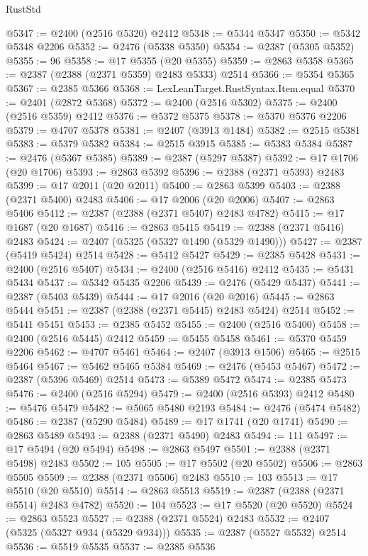 \begin{lexlean}{RustStd}
\begin{coremodule}
{\begin{coremodule}
{{{{{{{{{{{{{{{{{{{{{{{{{{{{{{{{{{{{{{{{{{{{{{{{{{@5347 := @2400 (@2516 @5320) @2412
@5348 := @5344 @5347
@5350 := @5342 @5348 @2206
@5352 := @2476 (@5338 @5350)
@5354 := @2387 (@5305 @5352)
@5355 := 96
@5358 := @17 @5355 (@20 @5355)
@5359 := @2863 @5358
@5365 := @2387 (@2388 (@2371 @5359) @2483 @5333) @2514
@5366 := @5354 @5365
@5367 := @2385 @5366
@5368 := LexLeanTarget.RustSyntax.Item.equal
@5370 := @2401 (@2872 @5368)
@5372 := @2400 (@2516 @5302)
@5375 := @2400 (@2516 @5359) @2412
@5376 := @5372 @5375
@5378 := @5370 @5376 @2206
@5379 := @4707 @5378
@5381 := @2407 (@3913 @1484)
@5382 := @2515 @5381
@5383 := @5379 @5382
@5384 := @2515 @3915
@5385 := @5383 @5384
@5387 := @2476 (@5367 @5385)
@5389 := @2387 (@5297 @5387)
@5392 := @17 @1706 (@20 @1706)
@5393 := @2863 @5392
@5396 := @2388 (@2371 @5393) @2483
@5399 := @17 @2011 (@20 @2011)
@5400 := @2863 @5399
@5403 := @2388 (@2371 @5400) @2483
@5406 := @17 @2006 (@20 @2006)
@5407 := @2863 @5406
@5412 := @2387 (@2388 (@2371 @5407) @2483 @4782)
@5415 := @17 @1687 (@20 @1687)
@5416 := @2863 @5415
@5419 := @2388 (@2371 @5416) @2483
@5424 := @2407 (@5325 (@5327 @1490 (@5329 @1490)))
@5427 := @2387 (@5419 @5424) @2514
@5428 := @5412 @5427
@5429 := @2385 @5428
@5431 := @2400 (@2516 @5407)
@5434 := @2400 (@2516 @5416) @2412
@5435 := @5431 @5434
@5437 := @5342 @5435 @2206
@5439 := @2476 (@5429 @5437)
@5441 := @2387 (@5403 @5439)
@5444 := @17 @2016 (@20 @2016)
@5445 := @2863 @5444
@5451 := @2387 (@2388 (@2371 @5445) @2483 @5424) @2514
@5452 := @5441 @5451
@5453 := @2385 @5452
@5455 := @2400 (@2516 @5400)
@5458 := @2400 (@2516 @5445) @2412
@5459 := @5455 @5458
@5461 := @5370 @5459 @2206
@5462 := @4707 @5461
@5464 := @2407 (@3913 @1506)
@5465 := @2515 @5464
@5467 := @5462 @5465 @5384
@5469 := @2476 (@5453 @5467)
@5472 := @2387 (@5396 @5469) @2514
@5473 := @5389 @5472
@5474 := @2385 @5473
@5476 := @2400 (@2516 @5294)
@5479 := @2400 (@2516 @5393) @2412
@5480 := @5476 @5479
@5482 := @5065 @5480 @2193
@5484 := @2476 (@5474 @5482)
@5486 := @2387 (@5290 @5484)
@5489 := @17 @1741 (@20 @1741)
@5490 := @2863 @5489
@5493 := @2388 (@2371 @5490) @2483
@5494 := 111
@5497 := @17 @5494 (@20 @5494)
@5498 := @2863 @5497
@5501 := @2388 (@2371 @5498) @2483
@5502 := 105
@5505 := @17 @5502 (@20 @5502)
@5506 := @2863 @5505
@5509 := @2388 (@2371 @5506) @2483
@5510 := 103
@5513 := @17 @5510 (@20 @5510)
@5514 := @2863 @5513
@5519 := @2387 (@2388 (@2371 @5514) @2483 @4782)
@5520 := 104
@5523 := @17 @5520 (@20 @5520)
@5524 := @2863 @5523
@5527 := @2388 (@2371 @5524) @2483
@5532 := @2407 (@5325 (@5327 @934 (@5329 @934)))
@5535 := @2387 (@5527 @5532) @2514
@5536 := @5519 @5535
@5537 := @2385 @5536
}}}}}}}}}}}}}}}}}}}}}}}}}}}}}}}}}}}}}}}}}}}}}}}}}}
\end{coremodule}}
\end{coremodule}
\end{lexlean}
